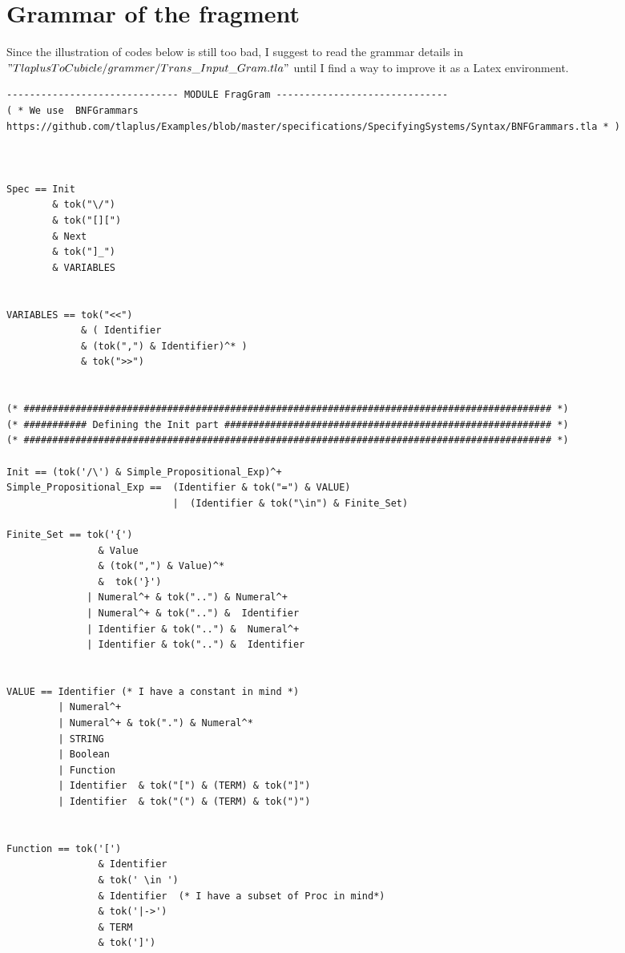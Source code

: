 \documentclass{article}
\theoremstyle{plain}
\numberwithin{equation}{section}
\begin{document}
\section{Grammar of the fragment } \label{Grammar}
Since the illustration of codes below is still too bad, I suggest to read the grammar details in $"TlaplusToCubicle/grammer/Trans\_Input\_Gram.tla"$ until I find a way to improve it as a Latex environment. 

\begin{lstlisting}
------------------------------ MODULE FragGram ------------------------------
( * We use  BNFGrammars https://github.com/tlaplus/Examples/blob/master/specifications/SpecifyingSystems/Syntax/BNFGrammars.tla * ) 



Spec == Init 
        & tok("\/") 
        & tok("[][") 
        & Next 
        & tok("]_") 
        & VARIABLES


VARIABLES == tok("<<")  
             & ( Identifier 
             & (tok(",") & Identifier)^* ) 
             & tok(">>")


(* ############################################################################################ *)
(* ########### Defining the Init part ######################################################### *)
(* ############################################################################################ *)

Init == (tok('/\') & Simple_Propositional_Exp)^+
Simple_Propositional_Exp ==  (Identifier & tok("=") & VALUE)   
                             |  (Identifier & tok("\in") & Finite_Set)

Finite_Set == tok('{') 
                & Value 
                & (tok(",") & Value)^*
                &  tok('}') 
              | Numeral^+ & tok("..") & Numeral^+
              | Numeral^+ & tok("..") &  Identifier
              | Identifier & tok("..") &  Numeral^+
              | Identifier & tok("..") &  Identifier  
 

VALUE == Identifier (* I have a constant in mind *) 
         | Numeral^+ 
         | Numeral^+ & tok(".") & Numeral^*
         | STRING 
         | Boolean   
         | Function
         | Identifier  & tok("[") & (TERM) & tok("]")
         | Identifier  & tok("(") & (TERM) & tok(")")
          

Function == tok('[')     
                & Identifier 
                & tok(' \in ') 
                & Identifier  (* I have a subset of Proc in mind*)
                & tok('|->') 
                & TERM
                & tok(']') 



\end{lstlisting}
\end{document}
